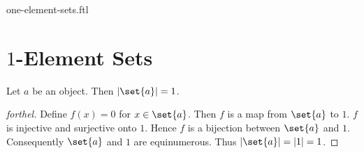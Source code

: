 \documentclass{naproche-library}
\begin{document}
\begin{smodule}{one-element-sets.ftl}

  \section*{$1$-Element Sets}

  \begin{proposition}[forthel,id=SET_THEORY_07_836893598023680,printid]
    Let $a$ be an object.
    Then $|\set{a}| = 1$.
  \end{proposition}
  \begin{proof}[forthel]
    Define $f(x) = 0$ for $x \in \set{a}$.
    Then $f$ is a map from $\set{a}$ to $1$.
    $f$ is injective and surjective onto $1$.
    Hence $f$ is a bijection between $\set{a}$ and $1$.
    Consequently $\set{a}$ and $1$ are equinumerous.
    Thus $|\set{a}| = |1| = 1$.
  \end{proof}
\end{smodule}
\end{document}
